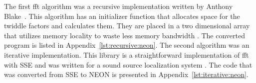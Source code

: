 The first \gls{fft} algorithm was a recursive implementation written by Anthony Blake~\cite{neon:recursive}. This algorithm has an initializer function that allocates space for the twiddle factors and calculates them. They are placed in a two dimensional array that utilizes memory locality to waste less memory bandwidth \cite{neon:recursive:details}. The converted program is listed in Appendix~\ref{lst:recursive:neon}. The second algorithm was an iterative implementation. This library is a straightforward implementation of \gls{fft} with SSE \cite{code:manyears} and was written for a sound source localization system \cite{manyears:site}. The code that was converted from SSE to NEON is presented in Appendix~\ref{lst:iterative:neon}.
